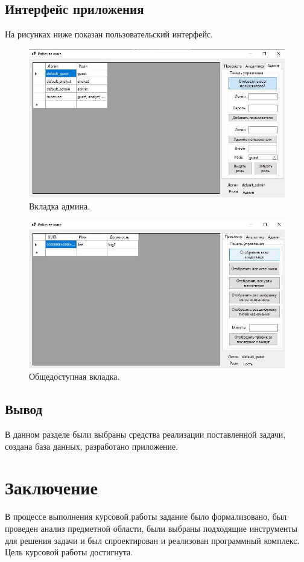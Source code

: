 \subsection{Интерфейс приложения}
На рисунках ниже показан пользовательский интерфейс.
\begin{figure}[H]
	\centering
	\includegraphics[scale=0.75]{admin.jpg}
	\caption{Вкладка админа.}
	\label{img:analytic}
\end{figure}
\begin{figure}[H]
	\centering
	\includegraphics[scale=0.75]{guest.jpg}
	\caption{Общедоступная вкладка.}
	\label{img:manager}
\end{figure}

\subsection{Вывод}
В данном разделе были выбраны средства реализации поставленной задачи, создана база данных, разработано приложение.
\newpage
\section*{Заключение}
В процессе выполнения курсовой работы задание было формализовано, был проведен анализ предметной области, были выбраны подходящие инструменты для решения задачи и был спроектирован и реализован программный комплекс. \\
\indent Цель курсовой работы достигнута.

